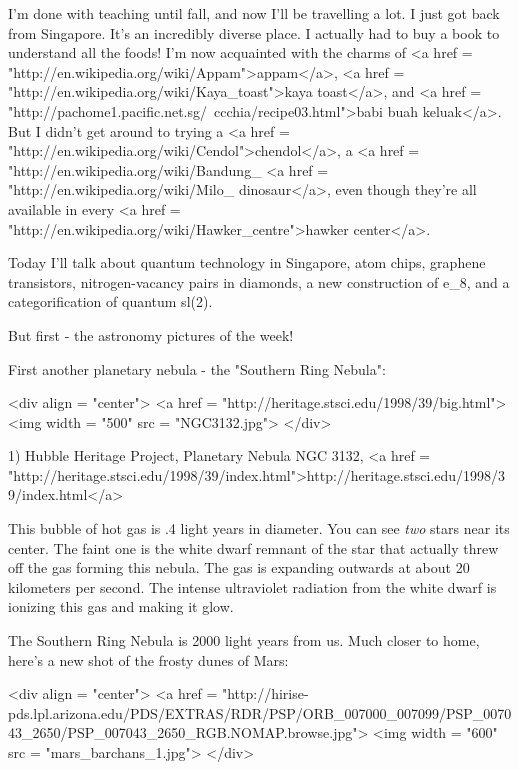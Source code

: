 


I'm done with teaching until fall, and now I'll be travelling a lot.
I just got back from Singapore.  It's an incredibly diverse place.  I
actually had to buy a book to understand all the foods!  I'm now
acquainted with the charms of <a href =
"http://en.wikipedia.org/wiki/Appam">appam</a>, <a href =
"http://en.wikipedia.org/wiki/Kaya_toast">kaya toast</a>, and <a href
= "http://pachome1.pacific.net.sg/~ccchia/recipe03.html">babi buah
keluak</a>.  But I didn't get around to trying a <a href =
"http://en.wikipedia.org/wiki/Cendol">chendol</a>, a <a href =
"http://en.wikipedia.org/wiki/Bandung_%
<a href = "http://en.wikipedia.org/wiki/Milo_%
dinosaur</a>, even though they're all available in every <a href =
"http://en.wikipedia.org/wiki/Hawker_centre">hawker center</a>.

Today I'll talk about quantum technology in Singapore, atom 
chips, graphene transistors, nitrogen-vacancy pairs in diamonds, 
a new construction of e_{8}, and a categorification of 
quantum sl(2).

But first - the astronomy pictures of the week!  

First another planetary nebula - the "Southern Ring Nebula": 


<div align = "center">
<a href = "http://heritage.stsci.edu/1998/39/big.html">
<img width = "500" src = "NGC3132.jpg">
</div>

1) Hubble Heritage Project, Planetary Nebula NGC 3132,
<a href = "http://heritage.stsci.edu/1998/39/index.html">http://heritage.stsci.edu/1998/39/index.html</a>

This bubble of hot gas is .4 light years in diameter.  You 
can see \emph{two} stars near its center.  The faint one is the 
white dwarf remnant of the star that actually threw off the 
gas forming this nebula.  The gas is expanding outwards at 
about 20 kilometers per second.  The intense ultraviolet 
radiation from the white dwarf is ionizing this gas and making 
it glow.

The Southern Ring Nebula is 2000 light years from us.  Much closer to
home, here's a new shot of the frosty dunes of Mars:

<div align = "center">
<a href = "http://hirise-pds.lpl.arizona.edu/PDS/EXTRAS/RDR/PSP/ORB_007000_007099/PSP_007043_2650/PSP_007043_2650_RGB.NOMAP.browse.jpg">
<img width = "600" src = "mars_barchans_1.jpg">
</div>


